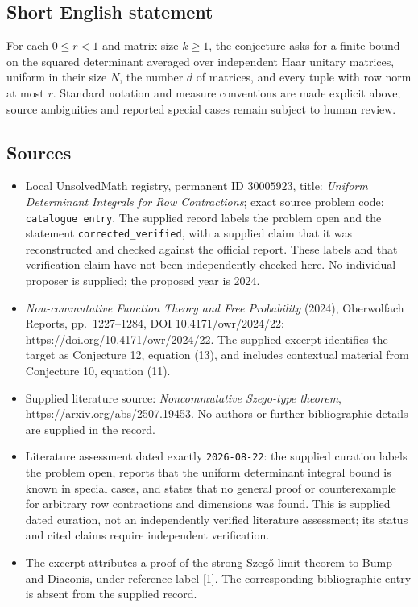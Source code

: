 \documentclass[11pt]{article}
\begin{document}
\subsection{Short English statement}
For each \(0\le r<1\) and matrix size \(k\ge1\), the conjecture asks for a finite bound on the squared determinant averaged over independent Haar unitary matrices, uniform in their size \(N\), the number \(d\) of matrices, and every tuple with row norm at most \(r\). Standard notation and measure conventions are made explicit above; source ambiguities and reported special cases remain subject to human review.
\subsection{Sources}
\begin{itemize}
\item Local UnsolvedMath registry, permanent ID \(30005923\), title: \emph{Uniform Determinant Integrals for Row Contractions}; exact source problem code: \texttt{catalogue entry}. The supplied record labels the problem open and the statement \texttt{corrected\_verified}, with a supplied claim that it was reconstructed and checked against the official report. These labels and that verification claim have not been independently checked here. No individual proposer is supplied; the proposed year is 2024.
\item \emph{Non-commutative Function Theory and Free Probability} (2024), Oberwolfach Reports, pp.\ 1227--1284, DOI 10.4171/owr/2024/22: \url{https://doi.org/10.4171/owr/2024/22}. The supplied excerpt identifies the target as Conjecture 12, equation (13), and includes contextual material from Conjecture 10, equation (11).
\item Supplied literature source: \emph{Noncommutative Szego-type theorem}, \url{https://arxiv.org/abs/2507.19453}. No authors or further bibliographic details are supplied in the record.
\item Literature assessment dated exactly \texttt{2026-08-22}: the supplied curation labels the problem open, reports that the uniform determinant integral bound is known in special cases, and states that no general proof or counterexample for arbitrary row contractions and dimensions was found. This is supplied dated curation, not an independently verified literature assessment; its status and cited claims require independent verification.
\item The excerpt attributes a proof of the strong Szeg\H{o} limit theorem to Bump and Diaconis, under reference label [1]. The corresponding bibliographic entry is absent from the supplied record.
\end{itemize}
\end{document}
